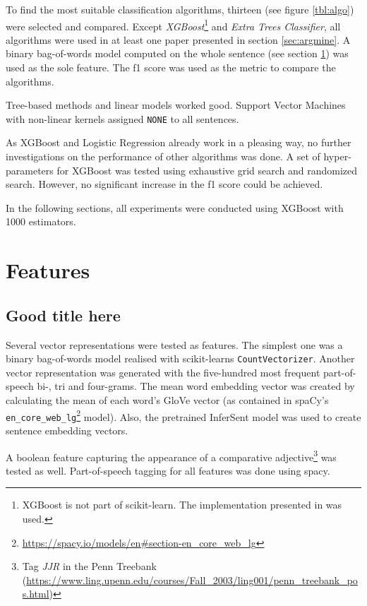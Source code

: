 To find the most suitable classification algorithms, thirteen (see figure \ref{tbl:algo}) were selected and compared. Except \emph{XGBoost}\footnote{XGBoost is not part of scikit-learn. The implementation presented in \cite{DBLP:journals/corr/ChenG16} was used.} and \emph{Extra Trees Classifier}, all algorithms were used in at least one paper presented in section \ref{sec:argmine}. A binary bag-of-words model computed on the whole sentence (see section \ref{sec:features}) was used as the sole feature. The f1 score was used as the metric to compare the algorithms. 

Tree-based methods and linear models worked good. Support Vector Machines with non-linear kernels assigned \texttt{NONE} to all sentences.

As XGBoost and Logistic Regression already work in a pleasing way, no further investigations on the performance of other algorithms was done. A set of hyper-parameters for XGBoost was tested using exhaustive grid search and randomized search. However, no significant increase in the f1 score could be achieved.

In the following sections, all experiments were conducted using XGBoost with 1000 estimators.


\section{Features}
\label{sec:features}
\subsection{Good title here}
Several vector representations were tested as features. The simplest one was a binary bag-of-words model realised with scikit-learns \texttt{CountVectorizer}. Another vector representation was generated with the five-hundred most frequent part-of-speech bi-, tri and four-grams. The mean word embedding vector was created by calculating the mean of each word's GloVe vector (as contained in spaCy's \texttt{en\_core\_web\_lg}\footnote{\url{https://spacy.io/models/en\#section-en\_core\_web\_lg}} model). Also, the pretrained InferSent model was used to create sentence embedding vectors.

A boolean feature capturing the appearance of a comparative adjective\footnote{Tag \emph{JJR} in the Penn Treebank (\url{https://www.ling.upenn.edu/courses/Fall\_2003/ling001/penn\_treebank\_pos.html})} was tested as well. Part-of-speech tagging for all features was done using spacy.\newline

